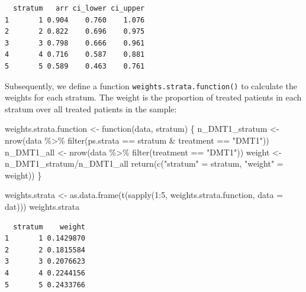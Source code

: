 \documentclass[
  letterpaper,
  DIV=11,
  numbers=noendperiod]{scrreprt}
\newenvironment{Shaded}{\begin{snugshade}}{\end{snugshade}}
\newcommand{\AttributeTok}[1]{\textcolor[rgb]{0.40,0.45,0.13}{#1}}
\newcommand{\ControlFlowTok}[1]{\textcolor[rgb]{0.00,0.23,0.31}{#1}}
\newcommand{\DecValTok}[1]{\textcolor[rgb]{0.68,0.00,0.00}{#1}}
\newcommand{\FunctionTok}[1]{\textcolor[rgb]{0.28,0.35,0.67}{#1}}
\newcommand{\NormalTok}[1]{\textcolor[rgb]{0.00,0.23,0.31}{#1}}
\newcommand{\OtherTok}[1]{\textcolor[rgb]{0.00,0.23,0.31}{#1}}
\newcommand{\SpecialCharTok}[1]{\textcolor[rgb]{0.37,0.37,0.37}{#1}}
\newcommand{\StringTok}[1]{\textcolor[rgb]{0.13,0.47,0.30}{#1}}
\begin{document}
\begin{verbatim}
  stratum   arr ci_lower ci_upper
1       1 0.904    0.760    1.076
2       2 0.822    0.696    0.975
3       3 0.798    0.666    0.961
4       4 0.716    0.587    0.881
5       5 0.589    0.463    0.761
\end{verbatim}

Subsequently, we define a function \texttt{weights.strata.function()} to
calculate the weights for each stratum. The weight is the proportion of
treated patients in each stratum over all treated patients in the
sample:

\begin{Shaded}
\begin{Highlighting}[]
\NormalTok{weights.strata.function }\OtherTok{\textless{}{-}} \ControlFlowTok{function}\NormalTok{(data, stratum) \{}
\NormalTok{  n\_DMT1\_stratum }\OtherTok{\textless{}{-}} \FunctionTok{nrow}\NormalTok{(data }\SpecialCharTok{\%\textgreater{}\%} \FunctionTok{filter}\NormalTok{(ps.strata }\SpecialCharTok{==}\NormalTok{ stratum }\SpecialCharTok{\&}\NormalTok{ treatment }\SpecialCharTok{==} \StringTok{"DMT1"}\NormalTok{))}
\NormalTok{  n\_DMT1\_all }\OtherTok{\textless{}{-}} \FunctionTok{nrow}\NormalTok{(data }\SpecialCharTok{\%\textgreater{}\%} \FunctionTok{filter}\NormalTok{(treatment }\SpecialCharTok{==} \StringTok{"DMT1"}\NormalTok{))}
\NormalTok{  weight }\OtherTok{\textless{}{-}}\NormalTok{ n\_DMT1\_stratum}\SpecialCharTok{/}\NormalTok{n\_DMT1\_all}
  \FunctionTok{return}\NormalTok{(}\FunctionTok{c}\NormalTok{(}\StringTok{"stratum"} \OtherTok{=}\NormalTok{ stratum, }\StringTok{"weight"} \OtherTok{=}\NormalTok{ weight))}
\NormalTok{\}}

\NormalTok{weights.strata }\OtherTok{\textless{}{-}} \FunctionTok{as.data.frame}\NormalTok{(}\FunctionTok{t}\NormalTok{(}\FunctionTok{sapply}\NormalTok{(}\DecValTok{1}\SpecialCharTok{:}\DecValTok{5}\NormalTok{, weights.strata.function, }\AttributeTok{data =}\NormalTok{ dat)))}
\NormalTok{weights.strata}
\end{Highlighting}
\end{Shaded}

\begin{verbatim}
  stratum    weight
1       1 0.1429870
2       2 0.1815584
3       3 0.2076623
4       4 0.2244156
5       5 0.2433766
\end{verbatim}
\end{document}

